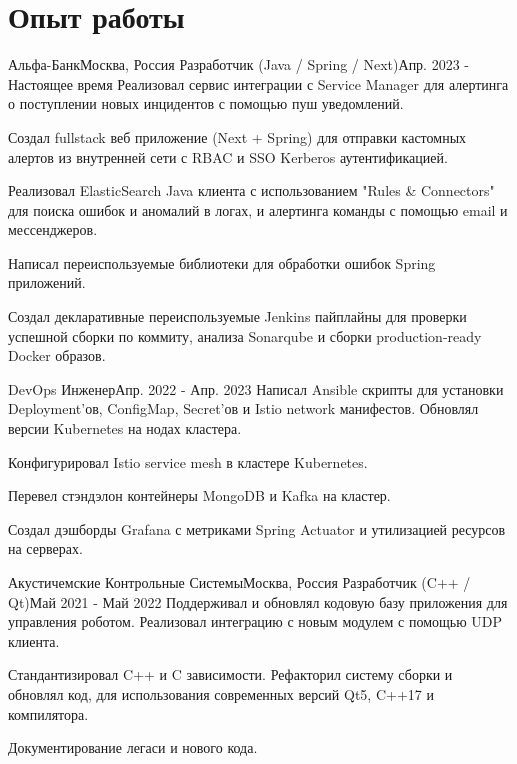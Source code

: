 

\section{Опыт работы}\label{sec:experience}
\resumeSubHeadingListStart

\resumeSubheading
{Альфа-Банк}{Москва, Россия}
    {Разработчик (Java / Spring / Next)}{Апр. 2023 - Настоящее время}
    \resumeItemListStart
        {Реализовал сервис интеграции с Service Manager для алертинга о поступлении новых инцидентов с помощью пуш уведомлений.}

        {Создал fullstack веб приложение (Next + Spring) для отправки кастомных алертов из внутренней сети с RBAC и SSO Kerberos аутентификацией.}

        {Реализовал ElasticSearch Java клиента с использованием "Rules \& Connectors" для поиска ошибок и аномалий в логах, и алертинга команды с помощью email и мессенджеров.}

        {Написал переиспользуемые библиотеки для обработки ошибок Spring приложений.}

        {Создал декларативные переиспользуемые Jenkins пайплайны для проверки успешной сборки по коммиту, анализа Sonarqube и сборки production-ready Docker образов.}
    \resumeItemListEnd

\resumeSubSubheading
{DevOps Инженер}{Апр. 2022 - Апр. 2023}
    \resumeItemListStart
        {Написал Ansible скрипты для установки Deployment'ов, ConfigMap, Secret'ов и Istio network манифестов. Обновлял версии Kubernetes на нодах кластера.}

        {Конфигурировал Istio service mesh в кластере Kubernetes.}

        {Перевел стэндэлон контейнеры MongoDB и Kafka на кластер.}

        {Создал дэшборды Grafana с метриками Spring Actuator и утилизацией ресурсов на серверах.}
    \resumeItemListEnd

\resumeSubheading
{Акустичемские Контрольные Системы}{Москва, Россия}
    {Разработчик (C++ / Qt)}{Май 2021 - Май 2022}
    \resumeItemListStart
        {Поддерживал и обновлял кодовую базу приложения для управления роботом. Реализовал интеграцию с новым модулем с помощью UDP клиента.}

        {Стандантизировал C++ и C зависимости. Рефакторил систему сборки и обновлял код, для использования современных версий Qt5, C++17 и компилятора.}

        {Документирование легаси и нового кода.}
    \resumeItemListEnd
\resumeSubHeadingListEnd